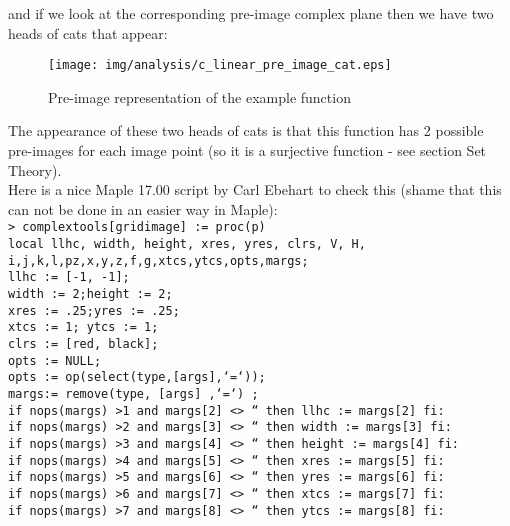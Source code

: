 	\begin{tcolorbox}[colframe=black,colback=white,sharp corners]
and if we look at the corresponding pre-image complex plane  then we have two heads of cats that appear:
	\begin{figure}[H]
		\begin{center}
			\texttt{[image: img/analysis/c\_linear\_pre\_image\_cat.eps]}
		\end{center}	
		\caption{Pre-image representation of the example function}
	\end{figure}
The appearance of these two heads of cats is that this function has 2 possible pre-images for each image point (so it is a surjective function - see section Set Theory).\\

Here is a nice Maple 17.00 script by Carl Ebehart to check this (shame that this can not be done in an easier way in Maple):\\

\texttt{> complextools[gridimage] := proc(p)\\
local llhc, width, height, xres, yres, clrs, V, H, i,j,k,l,pz,x,y,z,f,g,xtcs,ytcs,opts,margs;\\
llhc := [-1, -1];\\
width := 2;height := 2;\\
xres := .25;yres := .25;\\
xtcs := 1; ytcs := 1;\\
clrs := [red, black];\\
opts := NULL;\\
opts := op(select(type,[args],`=`));\\
margs:= remove(type, [args] ,`=`) ;\\
if nops(margs) >1 and margs[2] <> `` then llhc := margs[2] fi:\\
if nops(margs) >2 and margs[3] <> `` then width := margs[3] fi:\\
if nops(margs) >3 and margs[4] <> `` then height := margs[4] fi:\\
if nops(margs) >4 and margs[5] <> `` then xres := margs[5] fi:\\
if nops(margs) >5 and margs[6] <> `` then yres := margs[6] fi:\\
if nops(margs) >6 and margs[7] <> `` then xtcs := margs[7] fi:\\
if nops(margs) >7 and margs[8] <> `` then ytcs := margs[8] fi:}
	\end{tcolorbox}

